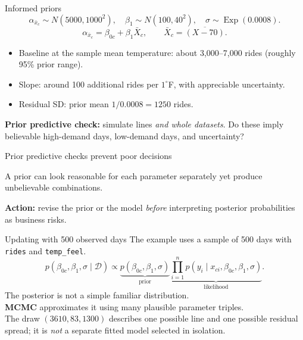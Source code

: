 \documentclass[aspectratio=43,11pt]{beamer}
\newcommand{\dd}{\mathcal D}
\begin{document}
\begin{frame}{Informed priors}
\[\alpha_{\bar x_c}\sim N(5000,1000^2),\quad \beta_1\sim N(100,40^2),\quad \sigma\sim\operatorname{Exp}(0.0008).\]
\[\alpha_{\bar x_c}=\beta_{0c}+\beta_1\bar X_c,\qquad \bar X_c=\overline{(X-70)}.\]

\begin{itemize}
\item Baseline at the sample mean temperature: about 3,000--7,000 rides (roughly 95\% prior range).
\item Slope: around 100 additional rides per $1^\circ$F, with appreciable uncertainty.
\item Residual SD: prior mean $1/0.0008=1250$ rides.
\end{itemize}

\par\medskip
\textbf{Prior predictive check:} simulate lines \emph{and whole datasets}. Do these imply believable high-demand days, low-demand days, and uncertainty?
\end{frame}

\begin{frame}{Prior predictive checks prevent poor decisions}
\begin{center}\end{center}
\par
A prior can look reasonable for each parameter separately yet produce unbelievable combinations.
\par\medskip\textbf{Action:} revise the prior or the model \emph{before} interpreting posterior probabilities as business risks.
\end{frame}

\begin{frame}{Updating with 500 observed days}
The example uses a sample of 500 days with \texttt{rides} and \texttt{temp\_feel}.
\[p(\beta_{0c},\beta_1,\sigma\mid\dd)\propto
\underbrace{p(\beta_{0c},\beta_1,\sigma)}_{\text{prior}}
\underbrace{\prod_{i=1}^{n}p(y_i\mid x_{ci},\beta_{0c},\beta_1,\sigma)}_{\text{likelihood}}.\]
The posterior is not a simple familiar distribution.\\
\textbf{MCMC} approximates it using many plausible parameter triples.\\
The draw $(3610,83,1300)$ describes one possible line and one possible residual spread; it is \emph{not} a separate fitted model selected in isolation.
\end{frame}
\end{document}
